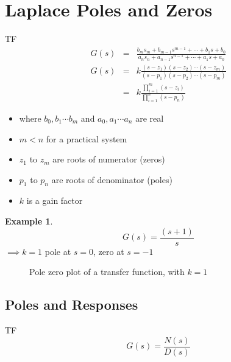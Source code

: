 \documentclass[11pt]{article} %
\theoremstyle{definition}
\newtheorem{example}{Example}[subsection]
\begin{document}
\section{Laplace Poles and Zeros}
	TF
	\begin{eqnarray}
		G(s) &=& \frac{b_ms_m + b_{m-1}s^{m-1}+\cdots + b_1s+b_0}{a_ns_n + a_{n-1}s^{n-1}+\cdots + a_1s+a_0} \nonumber \\
		G(s) &=& k \frac{(s-z_1)(s-z_2)\cdots(s-z_m)}{(s-p_1)(s-p_2)\cdots(s-p_m)} \nonumber \\
		&=& k\frac{\prod\limits_{i=1}^m(s-z_i)}{\prod\limits_{i=1}^n(s-p_n)}
	\end{eqnarray}

	\begin{itemize}
		\item where $b_0, b_1 \cdots b_m$ and $a_0, a_1 \cdots a_n$ are real
		\item $m<n$ for a practical system
		\item $z_1$ to $z_m$ are roots of numerator (zeros)
		\item $p_1$ to $p_n$ are roots of denominator (poles)
		\item $k$ is a gain factor
	\end{itemize}

	\begin{example}
		\begin{equation}
			G(s) = \frac{(s+1)}{s}
		\end{equation}
		$\implies k = 1$ pole at $s=0$, zero at $s=-1$
	\end{example}
	\begin{figure}[h]
		\centering
		\caption{Pole zero plot of a transfer function, with $k=1$}
	\end{figure}

\subsection{Poles and Responses}
	TF
	\begin{equation}
		G(s) = \frac{N(s)}{D(s)}
	\end{equation}
\end{document}
